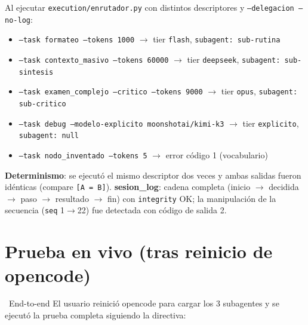\documentclass[11pt,a4paper]{article}
\newcommand{\iconotexto}[2]{\textcolor{cyanNeon}{\faIcon{#1}}~#2}
\begin{document}
\begin{tcolorbox}[tarjetaIcono, title={\faIcon{terminal}~Salidas reales del enrutador}]
Al ejecutar \texttt{execution/enrutador.py} con distintos descriptores y
\texttt{--delegacion --no-log}:
\begin{itemize}[leftmargin=16pt, itemsep=1pt]
  \item \texttt{--task formateo --tokens 1000} $\rightarrow$ tier \texttt{flash},
        \texttt{subagent: sub-rutina}
  \item \texttt{--task contexto\_masivo --tokens 60000} $\rightarrow$ tier \texttt{deepseek},
        \texttt{subagent: sub-sintesis}
  \item \texttt{--task examen\_complejo --critico --tokens 9000} $\rightarrow$ tier
        \texttt{opus}, \texttt{subagent: sub-critico}
  \item \texttt{--task debug --modelo-explicito moonshotai/kimi-k3} $\rightarrow$ tier
        \texttt{explicito}, \texttt{subagent: null}
  \item \texttt{--task nodo\_inventado --tokens 5} $\rightarrow$ error código 1 (vocabulario)
\end{itemize}
\end{tcolorbox}

\textbf{Determinismo}: se ejecutó el mismo descriptor dos veces y ambas salidas fueron
idénticas (compare \texttt{[A = B]}). \textbf{sesion\_log}: cadena completa
(inicio $\rightarrow$ decidida $\rightarrow$ paso $\rightarrow$ resultado $\rightarrow$ fin)
con \texttt{integrity} OK; la manipulación de la secuencia (\texttt{seq} 1$\rightarrow$22)
fue detectada con código de salida 2.

\section{Prueba en vivo (tras reinicio de opencode)}

\iconotexto{bolt}{End-to-end} El usuario reinició opencode para cargar los 3 subagentes
y se ejecutó la prueba completa siguiendo la directiva:
\end{document}
